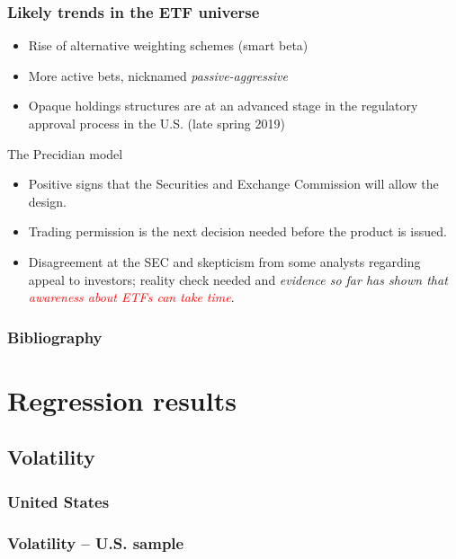 \documentclass[handout, 9pt, usenames, dvipsnames]{beamer}
\begin{document}
\begin{frame}
  \frametitle{Likely trends in the ETF universe}
  \begin{itemize}
  \item Rise of alternative weighting schemes (smart beta)  
  \item More active bets, nicknamed \textit{passive-aggressive}
  \item Opaque holdings structures are at an advanced stage in the regulatory approval process in the U.S. (late spring 2019)
  \end{itemize}
  \begin{block}{The Precidian model}
    \begin{itemize}
    \item Positive signs that the Securities and Exchange Commission will allow the design.
    \item Trading permission is the next decision needed before the product is issued.
    \item Disagreement at the SEC and skepticism from some analysts regarding appeal to investors; reality check needed and \textit{evidence so far has shown that \textcolor{red}{awareness about ETFs can take time}}.
    \end{itemize}
    
  \end{block}
  
\end{frame}


\begin{frame}
  \frametitle{Bibliography}
    \printbibliography
\end{frame}
\appendix
\section{Regression results}
\subsection{Volatility}
\subsubsection{United States}
\begin{frame}[allowframebreaks, t]
  \frametitle{Volatility -- U.S. sample}
  \centering
  
\end{frame}
\end{document}
